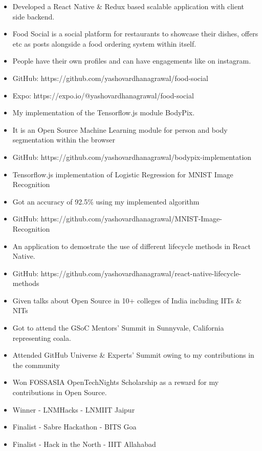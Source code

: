 \begin{itemize}
\item Developed a React Native \& Redux based scalable application with client side backend.
\item Food Social is a social platform for restaurants to showcase their dishes, offers etc as posts alongside a food ordering system within itself. 
\item People have their own profiles and can have engagements like on instagram.
\item GitHub: https://github.com/yashovardhanagrawal/food-social
\item Expo: https://expo.io/@yashovardhanagrawal/food-social
\end{itemize}
\smallskip
{}
\begin{itemize}
\item My implementation of the Tensorflow.js module BodyPix.
\item It is an Open Source Machine Learning module for person and body segmentation within the browser
\item GitHub: https://github.com/yashovardhanagrawal/bodypix-implementation
\end{itemize}
\smallskip
{}
\begin{itemize}
\item Tensorflow.js implementation of Logistic Regression for MNIST Image Recognition
\item Got an accuracy of 92.5\% using my implemented algorithm
\item GitHub: https://github.com/yashovardhanagrawal/MNIST-Image-Recognition
\end{itemize}
\smallskip
{}
\begin{itemize}
\item An application to demostrate the use of different lifecycle methods in React Native.
\item GitHub: https://github.com/yashovardhanagrawal/react-native-lifecycle-methods
\end{itemize}

\begin{itemize}
    \item Given talks about Open Source in 10+ colleges of India including IITs \& NITs
    \item Got to attend the GSoC Mentors' Summit in Sunnyvale, California representing coala.
    \item Attended GitHub Universe \& Experts' Summit owing to my contributions in the community
    \item Won FOSSASIA OpenTechNights Scholarship as a reward for my contributions in Open Source.
    \item Winner - LNMHacks - LNMIIT Jaipur
    \item Finalist - Sabre Hackathon - BITS Goa
    \item Finalist - Hack in the North - IIIT Allahabad
\end{itemize}